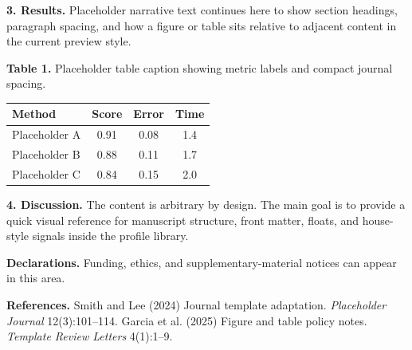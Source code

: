 \documentclass[10pt,a4paper]{article}
\begin{document}
\textbf{3. Results.} Placeholder narrative text continues here to show section headings, paragraph spacing, and how a figure or table sits relative to adjacent content in the current preview style.

\noindent\textbf{Table 1.} Placeholder table caption showing metric labels and compact journal spacing.\par\begin{center}
\begin{tabular}{lccc}
\toprule
Method & Score & Error & Time\\
\midrule
Placeholder A & 0.91 & 0.08 & 1.4\\
Placeholder B & 0.88 & 0.11 & 1.7\\
Placeholder C & 0.84 & 0.15 & 2.0\\
\bottomrule
\end{tabular}\end{center}\vspace{0.5em}

\textbf{4. Discussion.} The content is arbitrary by design. The main goal is to provide a quick visual reference for manuscript structure, front matter, floats, and house-style signals inside the profile library.


\noindent \textbf{Declarations.} Funding, ethics, and supplementary-material notices can appear in this area.\par
\vspace{0.5em}
\noindent \textbf{References.} Smith and Lee (2024) Journal template adaptation. \textit{Placeholder Journal} 12(3):101--114. Garcia et al. (2025) Figure and table policy notes. \textit{Template Review Letters} 4(1):1--9.\par
\vspace{0.6em}
\end{document}

